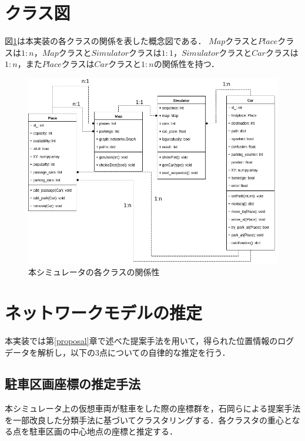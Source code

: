 \section{クラス図}
図\ref{class-implementation-figure}は本実装の各クラスの関係を表した概念図である．
$Map$クラスと$Place$クラスは$1:n$，$Map$クラスと$Simulator$クラスは$1:1$，$Simulator$クラスと$Car$クラスは$1:n$，また$Place$クラスは$Car$クラスと$1:n$の関係性を持つ．
\begin{figure}
	\centering
	\includegraphics[width=14cm]{fig/class_figure.png}
	\caption{本シミュレータの各クラスの関係性}
	\label{class-implementation-figure}
\end{figure}

\section{ネットワークモデルの推定}
\label{infer-networkmodel}
本実装では第\ref{proposal}章で述べた提案手法を用いて，得られた位置情報のログデータを解析し，以下の3点についての自律的な推定を行う．
\subsection{駐車区画座標の推定手法}
\label{infer_parking_position}
本シミュレータ上の仮想車両が駐車をした際の座標群を，石岡らによる提案手法\cite{Ishioka}を一部改良した分類手法に基づいてクラスタリングする．各クラスタの重心となる点を駐車区画の中心地点の座標と推定する．

